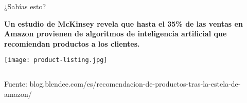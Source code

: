\documentclass{beamer}
\begin{document}
\begin{frame}{¿Sabías esto?}
    \begin{center}
        \begin{tcolorbox}[
            width=0.85\textwidth,
            colback=apriori-blue!30,
            colframe=apriori-blue,
            coltext=black!95,
            arc=5mm,
            boxrule=1.5pt,
            enhanced,
            drop shadow={shadow xshift=2pt, shadow yshift=-2pt}
        ]
            \normalsize
            \textbf{Un estudio de McKinsey revela que hasta el 35\% de las ventas en Amazon provienen de algoritmos de inteligencia artificial que recomiendan productos a los clientes.}
        \end{tcolorbox}
    \end{center}
    
    \vspace{0.3cm}
    
    \begin{center}
        \texttt{[image: product-listing.jpg]}
    \end{center}
    
    \vspace{0.3cm}
    
    \begin{columns}[T]
        \begin{column}{0.5\textwidth}
            \centering
        \end{column}
        
        \begin{column}{0.5\textwidth}
            \centering
        \end{column}
    \end{columns}
    
    \vspace{0.2cm}
    \begin{center}
        \tiny\textcolor{white!80}{Fuente: blog.blendee.com/es/recomendacion-de-productos-tras-la-estela-de-amazon/}
    \end{center}
\end{frame}
\end{document}
